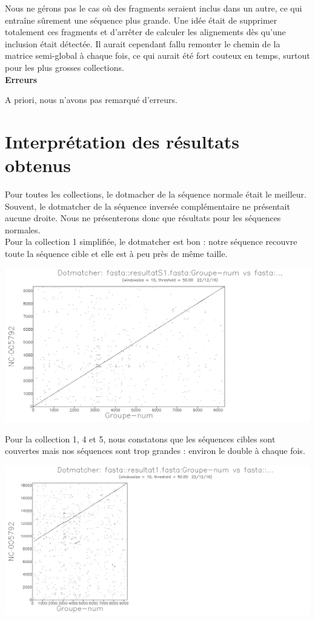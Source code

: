 \documentclass{article}
\begin{document}
Nous ne gérons pas le cas où des fragments seraient inclus dans un autre, ce qui entraîne sûrement une séquence plus grande.
Une idée était de supprimer totalement ces fragments et d'arrêter de calculer les alignements dès qu'une inclusion était détectée. Il aurait cependant fallu remonter le chemin de la matrice semi-global à chaque fois, ce qui aurait été fort couteux en temps, surtout pour les plus grosses collections. \\

\textbf{Erreurs}
\vspace{1.5mm}

A priori, nous n'avons pas remarqué d'erreurs.

\section{Interprétation des résultats obtenus}
Pour toutes les collections, le dotmacher de la séquence normale était le meilleur.
Souvent, le dotmatcher de la séquence inversée complémentaire ne présentait aucune droite. Nous ne présenterons donc que  résultats pour les séquences normales.\\

Pour la collection 1 simplifiée, le dotmatcher est bon : notre séquence recouvre toute la séquence cible et elle est à peu près de même taille.
\begin{center}
\includegraphics[scale=0.4]{dotmatcher1S.png}
\end{center}

Pour la collection 1, 4 et 5, nous constatons que les séquences cibles sont couvertes mais nos séquences sont trop grandes : environ le double à chaque fois.

\begin{center}
\includegraphics[scale=0.5]{dotmatcher1.png}
\end{center}
\end{document}
